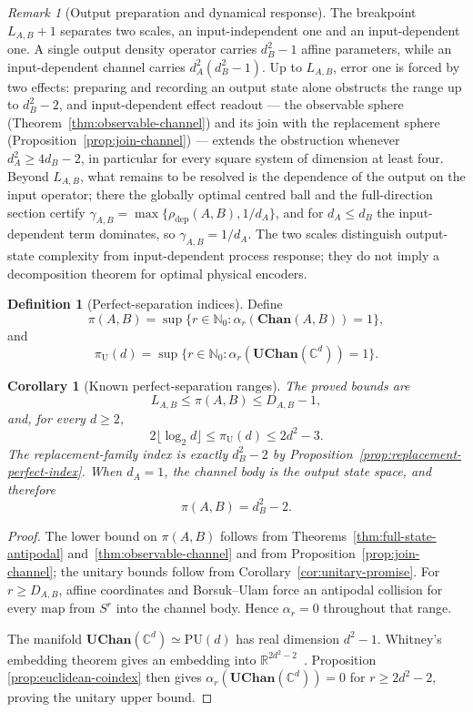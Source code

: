 \documentclass[11pt,a4paper]{article}
\theoremstyle{definition}
\newtheorem{definition}{Definition}[section]
\theoremstyle{plain}
\newtheorem{corollary}[theorem]{Corollary}
\theoremstyle{remark}
\newtheorem{remark}[theorem]{Remark}
\newcommand{\Chan}{\mathbf{Chan}}
\newcommand{\UChan}{\mathbf{UChan}}
\newcommand{\rhodep}{\rho_{\mathrm{dep}}}
\begin{document}
\begin{remark}[Output preparation and dynamical response]
The breakpoint $L_{A,B}+1$ separates two scales, an input-independent one
and an input-dependent one. A single
output density operator carries $d_B^2-1$ affine parameters, while an
input-dependent channel carries $d_A^2(d_B^2-1)$. Up to $L_{A,B}$, error one is forced by two effects: preparing and
recording an output state alone obstructs the range up to $d_B^2-2$, and
input-dependent effect readout --- the observable sphere
(Theorem~\ref{thm:observable-channel}) and its join with the replacement
sphere (Proposition~\ref{prop:join-channel}) --- extends the obstruction
whenever $d_A^2\ge4d_B-2$, in particular for every square system of
dimension at least four. Beyond $L_{A,B}$, what remains to be resolved is
the dependence of the output on the input operator; there the globally
optimal centred ball and the full-direction section certify
$\gamma_{A,B}=\max\{\rhodep(A,B),1/d_A\}$, and for $d_A\le d_B$ the
input-dependent term dominates, so $\gamma_{A,B}=1/d_A$. The two scales
distinguish output-state complexity from input-dependent process response;
they do not imply a decomposition theorem for optimal physical encoders.
\end{remark}

\begin{definition}[Perfect-separation indices]
Define
\[
\pi(A,B)=\sup\{r\in\mathbb N_0:\alpha_r(\Chan(A,B))=1\},
\]
and
\[
\pi_{\mathrm U}(d)
=\sup\{r\in\mathbb N_0:
\alpha_r(\UChan(\mathbb C^d))=1\}.
\]
\end{definition}

\begin{corollary}[Known perfect-separation ranges]
\label{cor:perfect-separation-indices}
The proved bounds are
\[
L_{A,B}\leq\pi(A,B)\leq D_{A,B}-1,
\]
and, for every $d\geq2$,
\[
2\lfloor\log_2d\rfloor
\leq\pi_{\mathrm U}(d)
\leq2d^2-3.
\]
The replacement-family index is exactly $d_B^2-2$ by
Proposition~\ref{prop:replacement-perfect-index}. When $d_A=1$, the channel
body is the output state space, and therefore
\[
\pi(A,B)=d_B^2-2.
\]
\end{corollary}

\begin{proof}
The lower bound on $\pi(A,B)$ follows from Theorems~\ref{thm:full-state-antipodal} and~\ref{thm:observable-channel} and from Proposition~\ref{prop:join-channel}; the unitary bounds follow from Corollary~\ref{cor:unitary-promise}. For $r\geq D_{A,B}$, affine
coordinates and Borsuk--Ulam force an antipodal collision for every map from
$S^r$ into the channel body. Hence $\alpha_r=0$ throughout that range.

The manifold $\UChan(\mathbb C^d)\simeq\mathrm{PU}(d)$ has real dimension
$d^2-1$. Whitney's embedding theorem gives an embedding into
$\mathbb R^{2d^2-2}$~\cite{Hirsch1976}. Proposition
\ref{prop:euclidean-coindex} then gives
$\alpha_r(\UChan(\mathbb C^d))=0$ for $r\geq2d^2-2$, proving the unitary
upper bound.
\end{proof}
\end{document}
